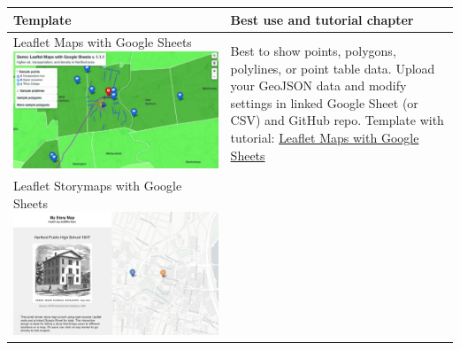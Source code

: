 \documentclass[
  english,
]{book}
\begin{document}
\begin{longtable}[]{@{}ll@{}}
\toprule
\begin{minipage}[b]{0.47\columnwidth}\raggedright
Template\strut
\end{minipage} & \begin{minipage}[b]{0.47\columnwidth}\raggedright
Best use and tutorial chapter\strut
\end{minipage}\tabularnewline
\midrule
\endhead
\begin{minipage}[t]{0.47\columnwidth}\raggedright
Leaflet Maps with Google Sheets \includegraphics{images/13-leaflet/leaflet-maps-with-google-sheets.png}\strut
\end{minipage} & \begin{minipage}[t]{0.47\columnwidth}\raggedright
Best to show points, polygons, polylines, or point table data. Upload your GeoJSON data and modify settings in linked Google Sheet (or CSV) and GitHub repo. Template with tutorial: \href{leaflet-maps-with-google-sheets}{Leaflet Maps with Google Sheets}\strut
\end{minipage}\tabularnewline
\begin{minipage}[t]{0.47\columnwidth}\raggedright
Leaflet Storymaps with Google Sheets \includegraphics{images/13-leaflet/leaflet-storymaps-with-google-sheets.png}\strut

\end{minipage}
\end{longtable}
\end{document}
